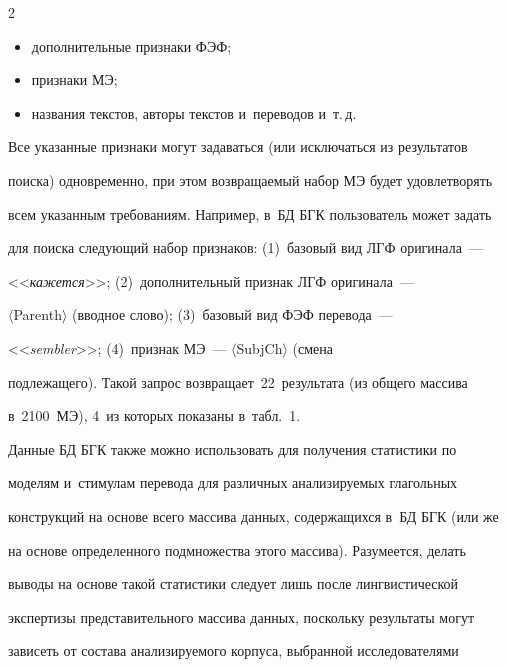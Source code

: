   \begin{multicols}{2}



\begin{itemize}

\item дополнительные признаки ФЭФ;

\item признаки МЭ;

\item названия текстов, авторы текстов и~переводов и~т.\,д.

\end{itemize}



  Все указанные признаки могут задаваться (или исключаться из результатов 

поиска) одновременно, при этом возвращаемый набор МЭ будет удовлетворять 

всем указанным требованиям. Например, в~БД БГК пользователь может задать 

для поиска следующий набор признаков: (1)~базовый вид ЛГФ оригинала~--- 

<<\textit{кажется}>>; (2)~дополнительный признак ЛГФ оригинала~--- 

$\langle$Parenth$\rangle$ (вводное слово); (3)~базовый вид ФЭФ перевода~--- 

<<\textit{sembler}>>; (4)~признак МЭ~--- $\langle${SubjCh}$\rangle$ (смена 

подлежащего). Такой запрос возвращает~22~результата (из общего массива 

в~2100~МЭ), 4~из которых показаны в~табл.~1.

  

  

  

    

  Данные БД БГК также можно использовать для получения статистики по 

моделям и~стимулам перевода для различных анализируемых глагольных 

конструкций на основе всего массива данных, содержащихся в~БД БГК (или же 

на основе определенного подмножества этого массива). Разумеется, делать 

выводы на основе такой статистики следует лишь после лингвистической 

экспертизы представительного массива данных, поскольку результаты могут 

зависеть от состава анализируемого корпуса, выбранной исследователями 


\end{multicols}
